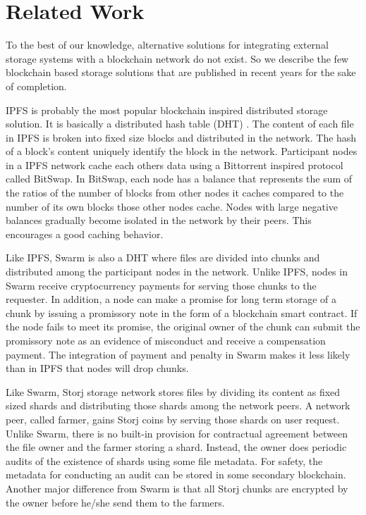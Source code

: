 \documentclass[conference]{IEEEtran}
\begin{document}





             

       
\section{Related Work}
\label{s-rw}
To the best of our knowledge, alternative solutions for integrating external storage systems with a blockchain network do not exist. So we describe the few blockchain based storage solutions that are published in recent years for the sake of completion.   

IPFS \cite{ipfs} is probably the most popular blockchain inspired distributed storage solution. It is basically a distributed hash table (DHT) \cite{Maymounkov:2002:KPI:646334.687801}. The content of each file in IPFS is broken into fixed size blocks and distributed in the network. The hash of a block's content uniquely identify the block in the network. Participant nodes in a IPFS network cache each others data using a Bittorrent \cite{Pouwelse:2005:BPF:2138958.2138984} inspired protocol called BitSwap. In BitSwap, each node has a balance that represents the sum of the ratios of the number of blocks from other nodes it caches compared to the number of its own blocks those other nodes cache. Nodes with large negative balances gradually become isolated in the network by their peers. This encourages a good caching behavior.

Like IPFS, Swarm \cite{swarm} is also a DHT where files are divided into chunks and distributed among the participant nodes in the network. Unlike IPFS, nodes in Swarm receive cryptocurrency payments for serving those chunks to the requester. In addition, a node can make a promise for long term storage of a chunk by issuing a promissory note in the form of a blockchain smart contract. If the node fails to meet its promise, the original owner of the chunk can submit the promissory note as an evidence of misconduct and receive a compensation payment. The integration of payment and penalty in Swarm makes it less likely than in IPFS that nodes will drop chunks.                      

Like Swarm, Storj \cite{Wilkinson14storja} storage network stores files by dividing its content as fixed sized shards and distributing those shards among the network peers. A network peer, called farmer, gains Storj coins by serving those shards on user request. Unlike Swarm, there is no built-in provision for contractual agreement between the file owner and the farmer storing a shard. Instead, the owner does periodic audits of the existence of shards using some file metadata. For safety, the metadata for conducting an audit can be stored in some secondary blockchain. Another major difference from Swarm is that all Storj chunks are encrypted by the owner before he/she send them to the farmers.         
\end{document}
